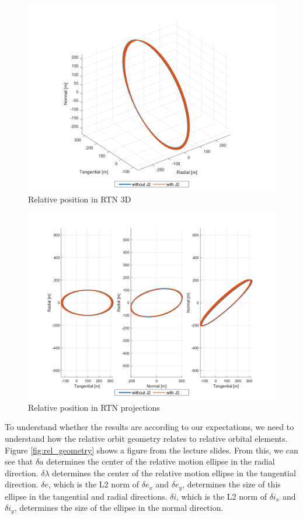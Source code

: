 \begin{figure}[H]
    \centering
    \includegraphics[width=0.75\linewidth]{sim/figures/PS4/RTN_3D_SV2.png}
    \caption{Relative position in RTN 3D}
    \label{fig:RTN_3D}
\end{figure}

\begin{figure}[H]
    \centering
    \includegraphics[width=0.75\linewidth]{sim/figures/PS4/RTN_projections_SV2.png}
    \caption{Relative position in RTN projections}
    \label{fig:RTN_projections}
\end{figure}

To understand whether the results are according to our expectations, we need to understand how the relative orbit geometry relates to relative orbital elements. Figure \ref{fig:rel_geometry} shows a figure from the lecture slides. From this, we can see that $\delta a$ determines the center of the relative motion ellipse in the radial direction. $\delta \lambda$ determines the center of the relative motion ellipse in the tangential direction. $\delta e$, which is the L2 norm of $\delta e_x$ and $\delta e_y$, determines the size of this ellipse in the tangential and radial directions. $\delta i$, which is the L2 norm of $\delta i_x$ and $\delta i_y$, determines the size of the ellipse in the normal direction. 

